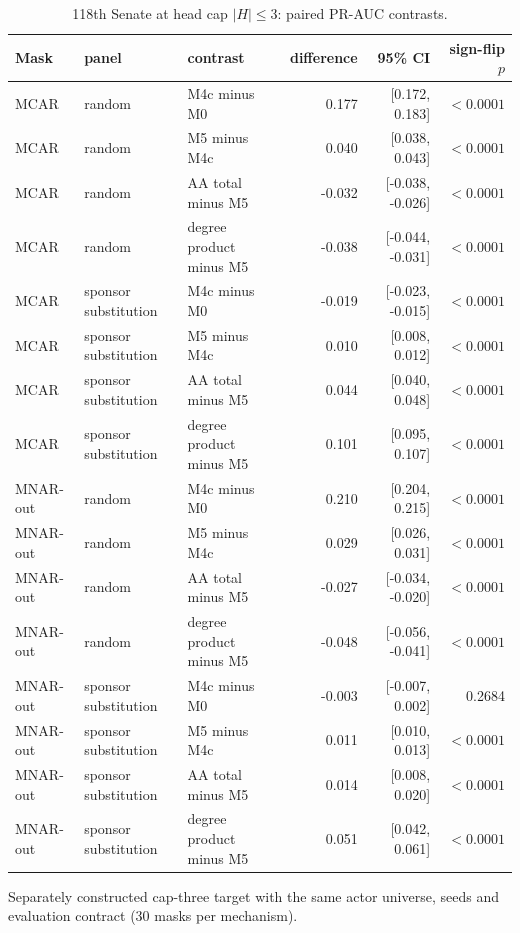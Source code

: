 \begin{table}[tbp]
\centering
\small
\caption{118th Senate at head cap $|H|\leq3$: paired PR-AUC contrasts.}
\label{tab:senate-cap-sensitivity}
\begin{tabular}{lllrrr}
\toprule
Mask & panel & contrast & difference & 95\% CI & sign-flip $p$ \\
\midrule
MCAR & random & M4c minus M0 & 0.177 & [0.172, 0.183] & $<0.0001$ \\
MCAR & random & M5 minus M4c & 0.040 & [0.038, 0.043] & $<0.0001$ \\
MCAR & random & AA total minus M5 & -0.032 & [-0.038, -0.026] & $<0.0001$ \\
MCAR & random & degree product minus M5 & -0.038 & [-0.044, -0.031] & $<0.0001$ \\
MCAR & sponsor substitution & M4c minus M0 & -0.019 & [-0.023, -0.015] & $<0.0001$ \\
MCAR & sponsor substitution & M5 minus M4c & 0.010 & [0.008, 0.012] & $<0.0001$ \\
MCAR & sponsor substitution & AA total minus M5 & 0.044 & [0.040, 0.048] & $<0.0001$ \\
MCAR & sponsor substitution & degree product minus M5 & 0.101 & [0.095, 0.107] & $<0.0001$ \\
MNAR-out & random & M4c minus M0 & 0.210 & [0.204, 0.215] & $<0.0001$ \\
MNAR-out & random & M5 minus M4c & 0.029 & [0.026, 0.031] & $<0.0001$ \\
MNAR-out & random & AA total minus M5 & -0.027 & [-0.034, -0.020] & $<0.0001$ \\
MNAR-out & random & degree product minus M5 & -0.048 & [-0.056, -0.041] & $<0.0001$ \\
MNAR-out & sponsor substitution & M4c minus M0 & -0.003 & [-0.007, 0.002] & 0.2684 \\
MNAR-out & sponsor substitution & M5 minus M4c & 0.011 & [0.010, 0.013] & $<0.0001$ \\
MNAR-out & sponsor substitution & AA total minus M5 & 0.014 & [0.008, 0.020] & $<0.0001$ \\
MNAR-out & sponsor substitution & degree product minus M5 & 0.051 & [0.042, 0.061] & $<0.0001$ \\
\bottomrule
\end{tabular}
\par\vspace{2pt}\footnotesize Separately constructed cap-three target with the same actor universe, seeds and evaluation contract (30 masks per mechanism).
\end{table}